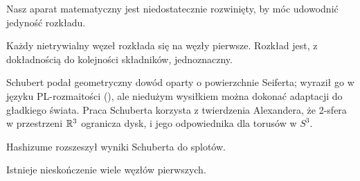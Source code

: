 Nasz aparat matematyczny jest niedostatecznie rozwinięty, by móc udowodnić jedyność rozkładu.

\begin{theorem}[Schubert, 1949]
    Każdy nietrywialny węzeł rozkłada się na węzły pierwsze.
    Rozkład jest, z dokładnością do kolejności składników, jednoznaczny.
%
\end{theorem}

Schubert podał geometryczny dowód oparty o powierzchnie Seiferta; wyraził go w języku PL-rozmaitości (\cite{schubert49}), ale niedużym wysiłkiem można dokonać adaptacji do gładkiego świata.
%
Praca Schuberta korzysta z twierdzenia Alexandera, że 2-sfera w przestrzeni $\mathbb R^3$ ogranicza dysk, i jego odpowiednika dla torusów w $S^3$.

Hashizume \cite{hashizume58} rozszeszył wyniki Schuberta do splotów.
%

\begin{proposition}
\label{prp:infinitely_many_prime_knots}%
    Istnieje nieskończenie wiele węzłów pierwszych.
\end{proposition}

